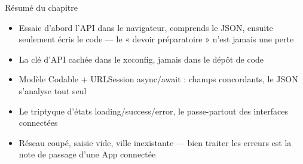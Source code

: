 \begin{tcbsummary}{Résumé du chapitre}
\begin{itemize}
  \item Essaie d'abord l'API dans le navigateur, comprends le JSON, ensuite seulement écris le code — le « devoir préparatoire » n'est jamais une perte
  \item La clé d'API cachée dans le xcconfig, jamais dans le dépôt de code
  \item Modèle Codable + URLSession async/await : champs concordants, le JSON s'analyse tout seul
  \item Le triptyque d'états loading/success/error, le passe-partout des interfaces connectées
  \item Réseau coupé, saisie vide, ville inexistante — bien traiter les erreurs est la note de passage d'une App connectée
\end{itemize}

\end{tcbsummary}
